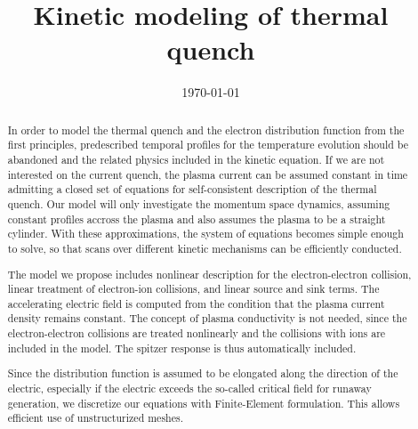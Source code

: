 \documentclass[reprint]{revtex4}
\begin{document}
\title{Kinetic modeling of thermal quench}

\date{\today}

\begin{abstract}
In order to model the thermal quench and the electron distribution function from the first principles, predescribed temporal profiles for the temperature evolution should be abandoned and the related physics included in the kinetic equation. If we are not interested on the current quench, the plasma current can be assumed constant in time admitting a closed set of equations for self-consistent description of the thermal quench. Our model will only investigate the momentum space dynamics, assuming constant profiles accross the plasma and also assumes the plasma to be a straight cylinder. With these approximations, the system of equations becomes simple enough to solve, so that scans over different kinetic mechanisms can be efficiently conducted. 

The model we propose includes nonlinear description for the electron-electron collision, linear treatment of electron-ion collisions, and linear source and sink terms. The accelerating electric field is computed from the condition that the plasma current density remains constant. The concept of plasma conductivity is not needed, since the electron-electron collisions are treated nonlinearly and the collisions with ions are included in the model. The spitzer response is thus automatically included.

Since the distribution function is assumed to be elongated along the direction of the electric, especially if the electric exceeds the so-called critical field for runaway generation, we discretize our equations with Finite-Element formulation. This allows efficient use of unstructurized meshes.
\end{abstract}


\maketitle
\end{document}
